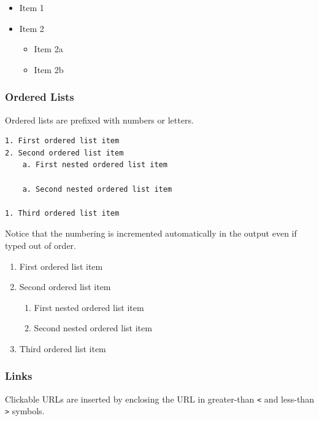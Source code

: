 \documentclass[]{article}
\providecommand{\tightlist}{%
  \setlength{\itemsep}{0pt}\setlength{\parskip}{0pt}}
\begin{document}
\begin{itemize}
\item
  Item 1
\item
  Item 2

  \begin{itemize}
  \tightlist
  \item
    Item 2a
  \item
    Item 2b
  \end{itemize}
\end{itemize}

\hypertarget{ordered-lists}{%
\subsubsection{Ordered Lists}\label{ordered-lists}}

Ordered lists are prefixed with numbers or letters.

\begin{verbatim}
1. First ordered list item
2. Second ordered list item
    a. First nested ordered list item
    
    a. Second nested ordered list item
    
1. Third ordered list item
\end{verbatim}

Notice that the numbering is incremented automatically in the output
even if typed out of order.

\begin{enumerate}
\def\labelenumi{\arabic{enumi}.}
\tightlist
\item
  First ordered list item
\item
  Second ordered list item

  \begin{enumerate}
  \def\labelenumii{\alph{enumii}.}
  \item
    First nested ordered list item
  \item
    Second nested ordered list item
  \end{enumerate}
\item
  Third ordered list item
\end{enumerate}

\hypertarget{links}{%
\subsubsection{Links}\label{links}}

Clickable URLs are inserted by enclosing the URL in greater-than
\texttt{\textless{}} and less-than \texttt{\textgreater{}} symbols.
\end{document}
